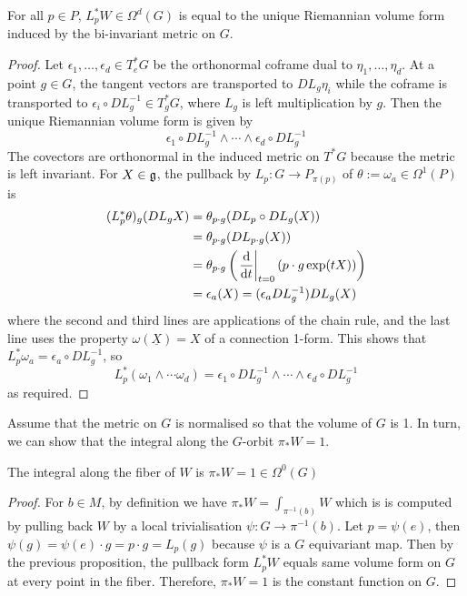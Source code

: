 \begin{prop}
	For all $p\in P$,  $L_p^* W \in \Omega^d(G)$ is equal to the unique
	Riemannian volume form induced by the bi-invariant metric on $G$. 
\end{prop}
\begin{proof}
	Let $\epsilon_1,\ldots,\epsilon_d\in T^*_eG$ be the orthonormal coframe dual
	to $\eta_1,\ldots,\eta_d$. At a point $g\in G$, the tangent vectors are
	transported to  $DL_g \eta_i$ while the coframe is transported to 
	$\epsilon_i\circ DL_{g}^{-1} \in T^*_gG$, where $L_g$ is left multiplication
	by  $g$. Then the unique Riemannian volume form is given by
	\[
	    \epsilon_1\circ DL_{g}^{-1} \wedge \cdots\wedge \epsilon_d\circ DL_{g}^{-1}
	\] 
	The covectors are orthonormal in the induced metric on $T^*G$ because the 
	metric is left invariant. For $X\in \operatorname{\mathfrak{g}}$, the pullback
	by $L_p : G \to P_{\pi(p)}$ of $\theta := \omega_a \in \Omega^1(P)$ is
	\begin{align*}
		(L_p^*\theta)_g(DL_g X) 
		&= \theta_{p\cdot g}(DL_p \circ DL_g(X)) \\
		&= \theta_{p\cdot g}(DL_{p\cdot g} (X)) \\
		&= \theta_{p\cdot g}\paren{\odv{}{t}_{t=0} (p\cdot g \exp(tX))} \\
		&= \epsilon_a(X)
		= (\epsilon_a DL_g^{-1})DL_g(X)
	\end{align*}
	where the second and third lines are applications of the chain rule, and the
	last line uses the property $\omega(\underline{X}) = X$ of a
	connection 1-form.
	This shows that $L_p^*\omega_a = \epsilon_a\circ DL_g^{-1}$, so 
	\[
	L_p^* (\omega_1\wedge \cdots\omega_d)
	= \epsilon_1\circ DL_{g}^{-1} \wedge \cdots\wedge \epsilon_d\circ DL_{g}^{-1}
	\] 
	as required.
\end{proof}
Assume that the metric on $G$ is normalised so that the volume of $G$ is 1.
In turn, we can show that the integral along the $G$-orbit $\pi_*W = 1$. 
\begin{cor}
	The integral along the fiber of $W$ is  $\pi_*W = 1 \in \Omega^0(G)$
\end{cor}
\begin{proof}
	For $b\in M$, by definition we have $\pi_*W = \int_{\pi^{-1}(b)} W$ which is
	is computed by pulling back $W$ by a 
	local trivialisation $\psi : G \to \pi^{-1}(b)$. 
	Let $p=\psi(e)$, then $\psi(g) = \psi(e)\cdot g = p\cdot g = L_p(g)$ because
	$\psi$ is a  $G$ equivariant map. Then by the previous proposition, the
	pullback form $L_p^*W$ equals same volume form on $G$ at every point in the 
	fiber. Therefore, $\pi_*W = 1$ is the constant function on  $G$.
\end{proof}

